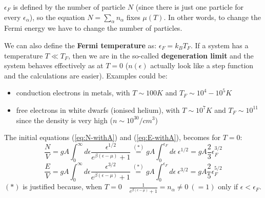 $\epsilon_F$ is defined by the number of particle $N$ (since there is just one particle for every $\epsilon_\alpha$), so the equation $N = \sum_\alpha n_\alpha$ fixes $\mu(T)$. In other words, to change the Fermi energy we have to change the number of particles.\\

We can also define the \textbf{Fermi temperature} as: $\epsilon_F = k_B T_F$. If a system has a temperature $T \ll T_F$, then we are in the so-called \textbf{degeneration limit} and the system behaves effectively as at $T=0$ ($n(\epsilon)$ actually look like a step function and the calculations are easier). Examples could be:
\begin{itemize}
    \item conduction electrons in metals, with $T \sim 100K $ and $T_F \sim 10^4 - 10^5 K$
    \item free electrons in white dwarfs (ionised helium), with $T \sim 10^7 K$ and $T_F \sim 10^{11}$ since the density is very high ($n \sim 10^{30}/cm^3$)\\ 
\end{itemize}
The initial equations (\ref{eq:N-withA}) and (\ref{eq:E-withA}), becomes for $T=0$:
$$\frac NV = gA\int_0^\infty d\epsilon \frac{\epsilon^{1/2}}{e^{\beta(\epsilon-\mu)}+1} \stackrel{(*)}= gA \int_0^{\epsilon_F} d\epsilon\ \epsilon^{1/2} = gA\frac23\epsilon_F^{3/2}$$
$$\frac EV = gA\int_0^\infty d\epsilon \frac{\epsilon^{3/2}}{e^{\beta(\epsilon-\mu)} +1} \stackrel{(*)}= gA\int_0^{\epsilon_F} d\epsilon\ \epsilon^{3/2} = gA\frac25\epsilon_F^{5/2} $$
$(*)$ is justified because, when $T=0 \quad \frac 1{e^{\beta(\epsilon-\mu)}+1} = n_\alpha \ne 0 \ (=1)$ only if $\epsilon < \epsilon_F$.

